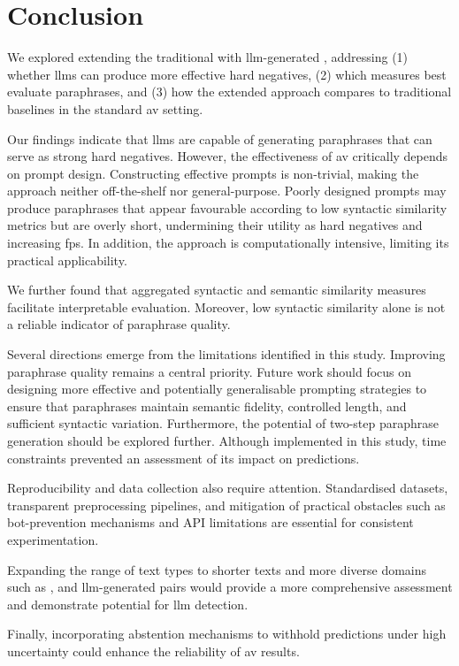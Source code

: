 \chapter{Conclusion}
\label{chap:conclusion}

We explored extending the traditional \impAppr{} with \ac{llm}-generated \imps{}, addressing (1) whether \acp{llm} can produce more effective hard negatives, (2) which measures best evaluate paraphrases, and (3) how the extended approach compares to traditional baselines in the standard \ac{av} setting.

Our findings indicate that \acp{llm} are capable of generating paraphrases that can serve as strong hard negatives. 
However, the effectiveness of \ac{av} critically depends on prompt design. 
Constructing effective prompts is non-trivial, making the approach neither off-the-shelf nor general-purpose. 
Poorly designed prompts may produce paraphrases that appear favourable according to low syntactic similarity metrics but are overly short, undermining their utility as hard negatives and increasing \acp{fp}. 
In addition, the approach is computationally intensive, limiting its practical applicability.  

We further found that aggregated syntactic and semantic similarity measures facilitate interpretable evaluation. Moreover, low syntactic similarity alone is not a reliable indicator of paraphrase quality. 




Several directions emerge from the limitations identified in this study. 
Improving paraphrase quality remains a central priority. 
Future work should focus on designing more effective and potentially generalisable prompting strategies to ensure that paraphrases maintain semantic fidelity, controlled length, and sufficient syntactic variation.  
%
Furthermore, the potential of two-step paraphrase generation should be explored further. 
Although implemented in this study, time constraints prevented an assessment of its impact on \impAppr{} predictions. 

Reproducibility and data collection also require attention. Standardised datasets, transparent preprocessing pipelines, and mitigation of practical obstacles such as bot-prevention mechanisms and API limitations are essential for consistent experimentation.

Expanding the range of text types to shorter texts and more diverse domains such as \dataPan{}, and \ac{llm}-generated pairs would provide a more comprehensive assessment and demonstrate potential for \ac{llm} detection.

Finally, incorporating abstention mechanisms to withhold predictions under high uncertainty could enhance the reliability of \ac{av} results.
